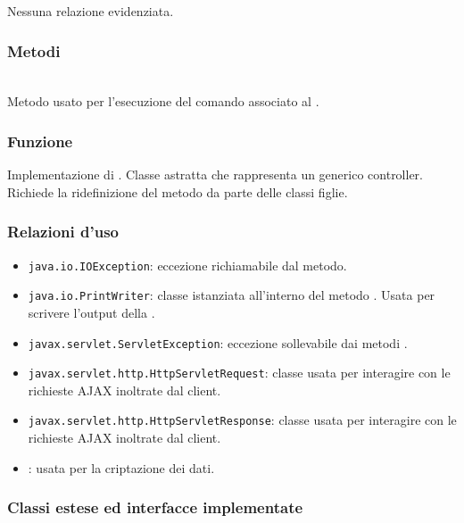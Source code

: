 Nessuna relazione evidenziata.

\subsubsection*{Metodi}
\begin{description}
	\item{}\\
	Metodo usato per l'esecuzione del comando associato al .
\end{description}


\subsubsection*{Funzione}
Implementazione di . Classe astratta che rappresenta un generico controller. Richiede la ridefinizione del metodo  da parte delle classi figlie.

\subsubsection*{Relazioni d'uso}
\begin{itemize}
	\item \texttt{java.io.IOException}: eccezione richiamabile dal metodo.
	\item \texttt{java.io.PrintWriter}: classe istanziata all'interno del metodo . Usata per scrivere l'output della .
	\item \texttt{javax.servlet.ServletException}: eccezione sollevabile dai metodi .
	\item \texttt{javax.servlet.http.HttpServletRequest}: classe usata per interagire con le richieste AJAX inoltrate dal client.
	\item \texttt{javax.servlet.http.HttpServletResponse}: classe usata per interagire con le richieste AJAX inoltrate dal client.
	\item {}: usata per la criptazione dei dati.
\end{itemize}

\subsubsection*{Classi estese ed interfacce implementate}

